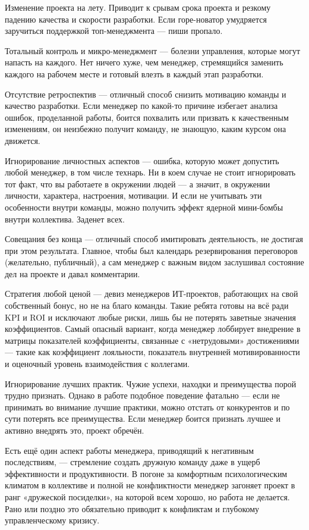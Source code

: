 \documentclass{../industrial-development}
\begin{document}
Изменение проекта на лету. Приводит к срывам срока проекта и резкому падению качества и скорости разработки. Если горе-новатор умудряется заручиться поддержкой топ-менеджмента — пиши пропало.

Тотальный контроль и микро-менеджмент — болезни управления, которые могут напасть на каждого. Нет ничего хуже, чем менеджер, стремящийся заменить каждого на рабочем месте и готовый влезть в каждый этап разработки. 

Отсутствие ретроспектив — отличный способ снизить мотивацию команды и качество разработки. Если менеджер по какой-то причине избегает анализа ошибок, проделанной работы, боится похвалить или призвать к качественным изменениям, он неизбежно получит команду, не знающую, каким курсом она движется.

Игнорирование личностных аспектов — ошибка, которую может допустить любой менеджер, в том числе технарь. Ни в коем случае не стоит игнорировать тот факт, что вы работаете в окружении людей — а значит, в окружении личности, характера, настроения, мотивации. И если не учитывать эти особенности внутри команды, можно получить эффект ядерной мини-бомбы внутри коллектива. Заденет всех.

Совещания без конца — отличный способ имитировать деятельность, не достигая при этом результата. Главное, чтобы был календарь резервирования переговоров (желательно, публичный), а сам менеджер с важным видом заслушивал состояние дел на проекте и давал комментарии. 

Стратегия любой ценой — девиз менеджеров ИТ-проектов, работающих на свой собственный бонус, но не на благо команды. Такие ребята готовы на всё ради KPI и ROI и исключают любые риски, лишь бы не потерять заветные значения коэффициентов. Самый опасный вариант, когда менеджер лоббирует внедрение в матрицы показателей коэффициенты, связанные с «нетрудовыми» достижениями — такие как коэффициент лояльности, показатель внутренней мотивированности и оценочный уровень взаимодействия с коллегами. 

Игнорирование лучших практик. Чужие успехи, находки и преимущества порой трудно признать. Однако в работе подобное поведение фатально — если не принимать во внимание лучшие практики, можно отстать от конкурентов и по сути потерять все преимущества. Если менеджер боится признать лучшее и активно внедрять это, проект обречён.

Есть ещё один аспект работы менеджера, приводящий к негативным последствиям, — стремление создать дружную команду даже в ущерб эффективности и продуктивности. В погоне за комфортным психологическим климатом в коллективе и полной не конфликтности менеджер загоняет проект в ранг «дружеской посиделки», на которой всем хорошо, но работа не делается. Рано или поздно это обязательно приводит к конфликтам и глубокому управленческому кризису. 
\end{document}
